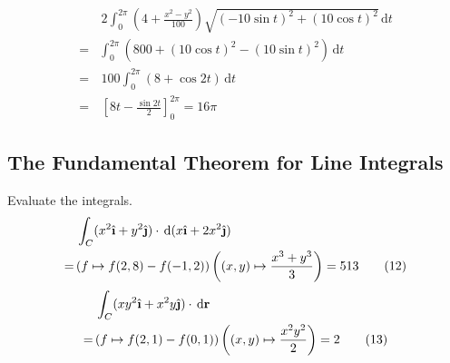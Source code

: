 \documentclass[a4paper,12pt]{article}
\newcommand{\ud}{\,\mathrm{d}}
\newcommand{\unit}[1]{\hat{\textbf #1}}
\begin{document}
\begin{align*}
  &\,2\int_0^{2\pi}\left(4 + \frac{x^2 - y^2}{100}\right)
  \sqrt{(-10\sin t)^2 + (10\cos t)^2}\ud t\\
= &\int_0^{2\pi}\left(800 + (10\cos t)^2 - (10\sin t)^2\right)\ud t\\
= &\,100\int_0^{2\pi}(8 + \cos 2t)\ud t\\
= &\,\left[8t - \frac{\sin 2t}{2}\right]_0^{2\pi}
= 16\pi\tag{48}
\end{align*}

\subsection{The Fundamental Theorem for Line Integrals}
Evaluate the integrals.
\begin{align*}
   &\int_C(x^2\unit\i + y^2\unit\j)\cdot\ud(x\unit\i + 2x^2\unit\j)\\
=\,&(f\mapsto f(2, 8) - f(-1, 2))\left((x, y)\mapsto\frac{x^3 + y^3}{3}\right)
= 513\tag{12}
\end{align*}
\begin{align*}
   &\int_C(xy^2\unit\i + x^2y\unit\j)\cdot\ud\mathbf{r}\\
=\,&(f\mapsto f(2, 1) - f(0, 1))\left((x, y)\mapsto\frac{x^2y^2}{2}\right)
= 2\tag{13}
\end{align*}
\end{document}
